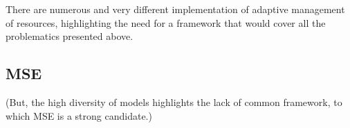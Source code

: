 \documentclass[12pt,a4paper]{article}
\begin{document}
There are numerous and very different implementation of adaptive management of resources, highlighting the need for a framework that would cover all the problematics presented above. 

\subsection{MSE}

(But, the high diversity of models highlights the lack of common framework, to which MSE is a strong candidate.)

\end{document}
